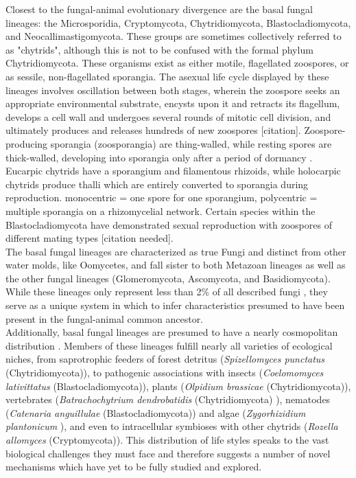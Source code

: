 \indent Closest to the fungal-animal evolutionary divergence are the basal fungal lineages: the Microsporidia, Cryptomycota, Chytridiomycota, Blastocladiomycota, and Neocallimastigomycota. These groups are sometimes collectively referred to as "chytrids", although this is not to be confused with the formal phylum Chytridiomycota. These organisms exist as either motile, flagellated zoospores, or as sessile, non-flagellated sporangia. The asexual life cycle displayed by these lineages involves oscillation between both stages, wherein the zoospore seeks an appropriate environmental substrate, encysts upon it and retracts its flagellum, develops a cell wall and undergoes several rounds of mitotic cell division, and ultimately produces and releases hundreds of new zoospores [citation]. Zoospore-producing sporangia (zoosporangia) are thing-walled, while resting spores are thick-walled, developing into sporangia only after a period of dormancy \cite{James2006}. Eucarpic chytrids have a sporangium and filamentous rhizoids, while holocarpic chytrids produce thalli which are entirely converted to sporangia during reproduction. monocentric = one spore for one sporangium, polycentric = multiple sporangia on a rhizomycelial network. Certain species within the Blastocladiomycota have demonstrated sexual reproduction with zoospores of different mating types [citation needed].\\
\indent The basal fungal lineages are characterized as true Fungi and distinct from other water molds, like Oomycetes, and fall sister to both Metazoan lineages as well as the other fungal lineages (Glomeromycota, Ascomycota, and Basidiomycota). While these lineages only represent less than 2\% of all described fungi \cite{Stajich2009}, they serve as a unique system in which to infer characteristics presumed to have been present in the fungal-animal common ancestor.\\
\indent Additionally, basal fungal lineages are presumed to have a nearly cosmopolitan distribution \cite{Powell1993}. Members of these lineages fulfill nearly all varieties of ecological niches, from saprotrophic feeders of forest detritus (\textit{Spizellomyces punctatus} (Chytridiomycota)), to pathogenic associations with insects (\textit{Coelomomyces lativittatus} (Blastocladiomycota)), plants (\textit{Olpidium brassicae} (Chytridiomycota)), vertebrates (\textit{Batrachochytrium dendrobatidis} (Chytridiomycota) \cite{Longcore1999}), nematodes (\textit{Catenaria anguillulae} (Blastocladiomycota)) and algae (\textit{Zygorhizidium plantonicum} \cite{Canter1967}), and even to intracellular symbioses with other chytrids (\textit{Rozella allomyces} (Cryptomycota)). This distribution of life styles speaks to the vast biological challenges they must face and therefore suggests a number of novel mechanisms which have yet to be fully studied and explored. \\
